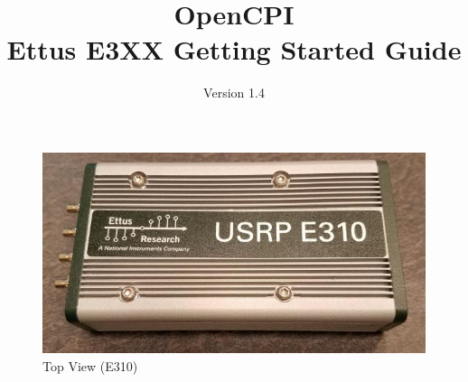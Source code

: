 \def\docTitle{OpenCPI\\Ettus E3XX Getting Started Guide}
\def\docVersion{1.4}


\date{Version \docVersion} %
\title{\docTitle}
\usepackage[T1]{fontenc} %
\usepackage{graphicx}
\graphicspath{ {figures/} }

\maketitle
\begin{figure}[H]
 \centering
 \includegraphics[scale=0.9]{img/top.jpg}
 \caption{Top View (E310)}
 \label{fig:top}
\end{figure}
\newpage

